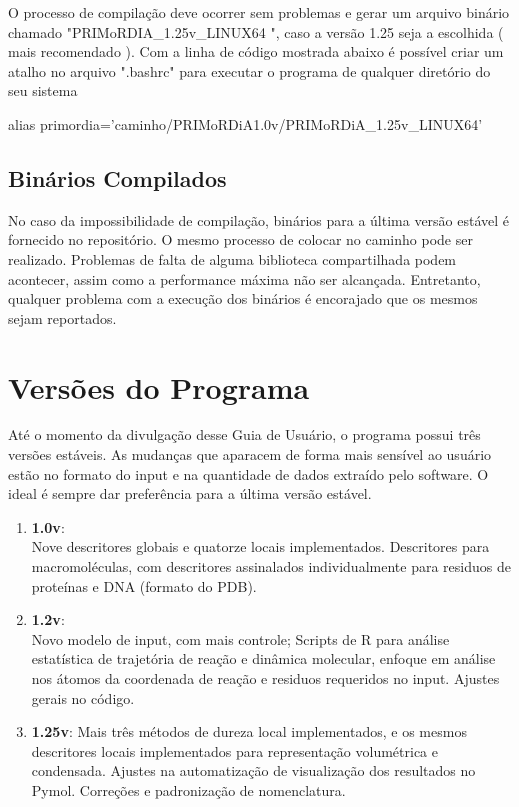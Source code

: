 \documentclass[a4paper,11pt]{refart}
\begin{document}
O processo de compilação deve ocorrer sem problemas e gerar um arquivo binário chamado "PRIMoRDIA\_1.25v\_LINUX64 ", caso a versão 1.25 seja a escolhida ( mais recomendado ).
Com a linha de código mostrada abaixo é possível criar um atalho no arquivo ".bashrc" para executar o programa de qualquer diretório do seu sistema

\hspace*{-\leftmarginwidth}
\begin{minipage}{\fullwidth}
\begin{commandshell}
alias primordia='caminho/PRIMoRDiA1.0v/PRIMoRDiA\_1.25v\_LINUX64'
\end{commandshell}
\end{minipage}


\subsection{Binários Compilados} 

No caso da impossibilidade de compilação, binários para a última versão estável é fornecido no repositório. O mesmo processo de colocar no caminho pode ser realizado. Problemas de falta de alguma biblioteca compartilhada podem acontecer, assim como a performance máxima não ser alcançada. Entretanto, qualquer problema com a execução dos binários é encorajado que os mesmos sejam reportados. 

\newpage
\section{Versões do Programa}

Até o momento da divulgação desse Guia de Usuário, o programa possui três versões estáveis. 
As mudanças que aparacem de forma mais sensível ao usuário estão no formato do input e na quantidade de dados extraído pelo software. O ideal é sempre dar preferência para a última versão estável. 

\begin{enumerate}
	\item \textbf{1.0v}:\\
	Nove descritores globais e quatorze locais implementados. Descritores para macromoléculas, com descritores assinalados individualmente para residuos de proteínas e DNA (formato do PDB).  
	\item \textbf{1.2v}:
	\\ Novo modelo de input, com mais controle; Scripts de R para análise estatística de trajetória de reação e dinâmica molecular, enfoque em análise nos átomos da coordenada de reação e residuos requeridos no input. Ajustes gerais no código. 
	\item \textbf{1.25v}: Mais três métodos de dureza local implementados, e os mesmos descritores locais implementados para representação volumétrica e condensada. Ajustes na automatização de visualização dos resultados no Pymol. Correções e padronização de nomenclatura. 
\end{enumerate}
\end{document}
